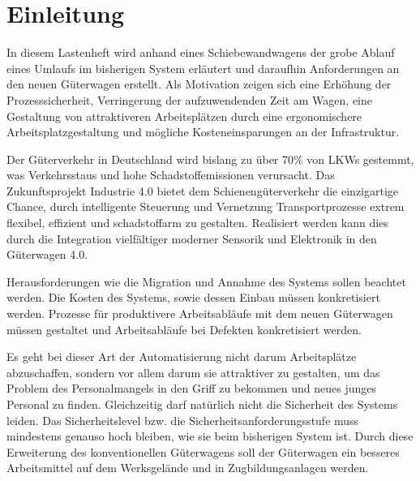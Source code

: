 \section{Einleitung}
In diesem Lastenheft wird anhand eines Schiebewandwagens der grobe Ablauf eines Umlaufs im bisherigen System erläutert und daraufhin Anforderungen an den neuen Güterwagen erstellt. Als Motivation zeigen sich %
eine Erhöhung der Prozesssicherheit, Verringerung der aufzuwendenden Zeit am Wagen, eine Gestaltung von attraktiveren Arbeitsplätzen durch eine ergonomischere Arbeitsplatzgestaltung und mögliche Kosteneinsparungen an der Infrastruktur.\par
Der Güterverkehr in Deutschland wird bislang zu über 70\% von LKWs gestemmt, was Verkehrsstaus und hohe Schadstoffemissionen verursacht. Das Zukunftsprojekt Industrie 4.0 bietet dem Schienengüterverkehr die einzigartige Chance, durch intelligente Steuerung und Vernetzung Transportprozesse extrem flexibel, effizient und schadstoffarm zu gestalten. Realisiert werden kann dies durch die Integration vielfältiger moderner Sensorik und Elektronik in den Güterwagen 4.0.\cite{AZAP}\par
Herausforderungen wie die Migration und Annahme des Systems sollen beachtet werden. Die Kosten des Systems, sowie dessen Einbau müssen konkretisiert werden. Prozesse für produktivere Arbeitsabläufe mit dem neuen Güterwagen müssen gestaltet und Arbeitsabläufe bei Defekten konkretisiert werden.\par
Es geht bei dieser Art der Automatisierung nicht darum Arbeitsplätze abzuschaffen, sondern vor allem darum sie attraktiver zu gestalten, um das Problem des Personalmangels in den Griff zu bekommen und neues junges Personal zu finden. Gleichzeitig darf natürlich nicht die Sicherheit des Systems leiden. Das Sicherheitslevel bzw. die Sicherheitsanforderungsstufe muss mindestens genauso hoch bleiben, wie sie beim bisherigen System ist. Durch diese Erweiterung des konventionellen Güterwagens soll der Güterwagen ein besseres Arbeitsmittel auf dem Werksgelände und in Zugbildungsanlagen werden.\par



